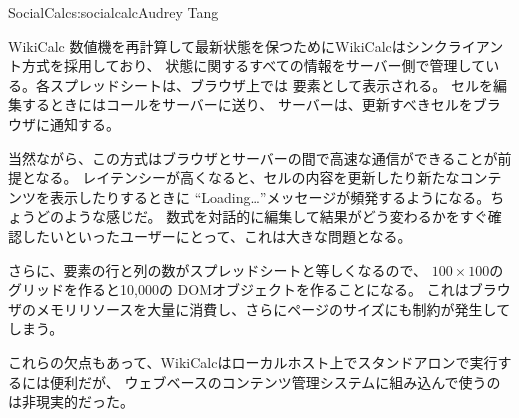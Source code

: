 \begin{aosachapter}{SocialCalc}{s:socialcalc}{Audrey Tang}
\begin{aosasect1}{WikiCalc}
数値機を再計算して最新状態を保つためにWikiCalcはシンクライアント方式を採用しており、
状態に関するすべての情報をサーバー側で管理している。各スプレッドシートは、ブラウザ上では
要素として表示される。
セルを編集するときにはコールをサーバーに送り、
サーバーは、更新すべきセルをブラウザに通知する。

当然ながら、この方式はブラウザとサーバーの間で高速な通信ができることが前提となる。
レイテンシーが高くなると、セルの内容を更新したり新たなコンテンツを表示したりするときに
``Loading\ldots''メッセージが頻発するようになる。ちょうどのような感じだ。
数式を対話的に編集して結果がどう変わるかをすぐ確認したいといったユーザーにとって、これは大きな問題となる。


さらに、要素の行と列の数がスプレッドシートと等しくなるので、
$100{\times}100$のグリッドを作ると10,000の DOMオブジェクトを作ることになる。
これはブラウザのメモリリソースを大量に消費し、さらにページのサイズにも制約が発生してしまう。

これらの欠点もあって、WikiCalcはローカルホスト上でスタンドアロンで実行するには便利だが、
ウェブベースのコンテンツ管理システムに組み込んで使うのは非現実的だった。


\end{aosasect1}
\end{aosachapter}
